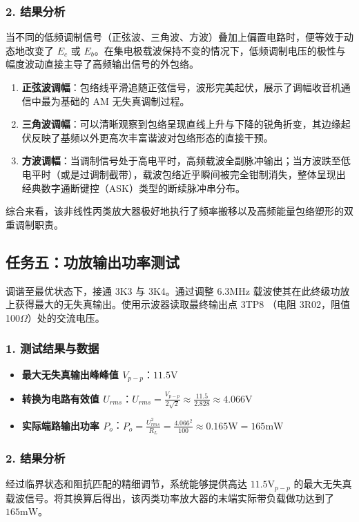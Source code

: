 \documentclass[12pt]{article}
\begin{document}
\subsubsection*{2. 结果分析}
当不同的低频调制信号（正弦波、三角波、方波）叠加上偏置电路时，便等效于动态地改变了 $E_c$ 或 $E_b$。在集电极载波保持不变的情况下，低频调制电压的极性与幅度波动直接主导了高频输出信号的外包络。
\begin{enumerate}
    \item \textbf{正弦波调幅}：包络线平滑追随正弦信号，波形完美起伏，展示了调幅收音机通信中最为基础的 AM 无失真调制过程。
    \item \textbf{三角波调幅}：可以清晰观察到包络呈现直线上升与下降的锐角折变，其边缘起伏反映了基频以外更高次丰富谐波对包络形态的直接干预。
    \item \textbf{方波调幅}：当调制信号处于高电平时，高频载波全副脉冲输出；当方波跌至低电平时（或是过调制截带），载波包络近乎瞬间被完全钳制消失，整体呈现出经典数字通断键控（ASK）类型的断续脉冲串分布。
\end{enumerate}
综合来看，该非线性丙类放大器极好地执行了频率搬移以及高频能量包络塑形的双重调制职责。

\subsection*{任务五：功放输出功率测试}

调谐至最优状态下，接通 3K3 与 3K4。通过调整 6.3MHz 载波使其在此终级功放上获得最大的无失真输出。使用示波器读取最终输出点 3TP8 （电阻 3R02，阻值 100$\Omega$）处的交流电压。

\subsubsection*{1. 测试结果与数据}
\begin{itemize}
    \item \textbf{最大无失真输出峰峰值 $V_{p-p}$}：$11.5\text{V}$
    \item \textbf{转换为电路有效值 $U_{rms}$}：$U_{rms} = \frac{V_{p-p}}{2\sqrt{2}} \approx \frac{11.5}{2.828} \approx 4.066\text{V}$
    \item \textbf{实际端路输出功率 $P_o$}：$P_o = \frac{U_{rms}^2}{R_L} = \frac{4.066^2}{100} \approx 0.165\text{W} = 165\text{mW}$
\end{itemize}

\subsubsection*{2. 结果分析}
经过临界状态和阻抗匹配的精细调节，系统能够提供高达 $11.5\text{V}_{p-p}$ 的最大无失真载波信号。将其换算后得出，该丙类功率放大器的末端实际带负载做功达到了 $165\text{mW}$。
\end{document}
